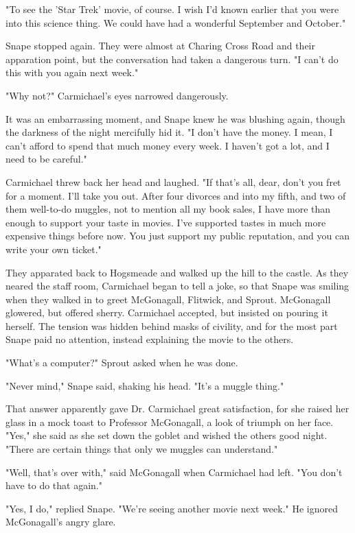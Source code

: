 \documentclass[a4paper,11pt]{article}
\begin{document}
"To see the 'Star Trek' movie, of course. I wish I'd known earlier that you were into this science thing. We could have had a wonderful September and October."

Snape stopped again. They were almost at Charing Cross Road and their apparation point, but the conversation had taken a dangerous turn. "I can't do this with you again next week."

"Why not?" Carmichael's eyes narrowed dangerously.

It was an embarrassing moment, and Snape knew he was blushing again, though the darkness of the night mercifully hid it. "I don't have the money. I mean, I can't afford to spend that much money every week. I haven't got a lot, and I need to be careful."

Carmichael threw back her head and laughed. "If that's all, dear, don't you fret for a moment. I'll take you out. After four divorces and into my fifth, and two of them well-to-do muggles, not to mention all my book sales, I have more than enough to support your taste in movies. I've supported tastes in much more expensive things before now. You just support my public reputation, and you can write your own ticket."

They apparated back to Hogsmeade and walked up the hill to the castle. As they neared the staff room, Carmichael began to tell a joke, so that Snape was smiling when they walked in to greet McGonagall, Flitwick, and Sprout. McGonagall glowered, but offered sherry. Carmichael accepted, but insisted on pouring it herself. The tension was hidden behind masks of civility, and for the most part Snape paid no attention, instead explaining the movie to the others.

"What's a computer?" Sprout asked when he was done.

"Never mind," Snape said, shaking his head. "It's a muggle thing."

That answer apparently gave Dr. Carmichael great satisfaction, for she raised her glass in a mock toast to Professor McGonagall, a look of triumph on her face. "Yes," she said as she set down the goblet and wished the others good night. "There are certain things that only we muggles can understand."

"Well, that's over with," said McGonagall when Carmichael had left. "You don't have to do that again."

"Yes, I do," replied Snape. "We're seeing another movie next week." He ignored McGonagall's angry glare.
\end{document}

